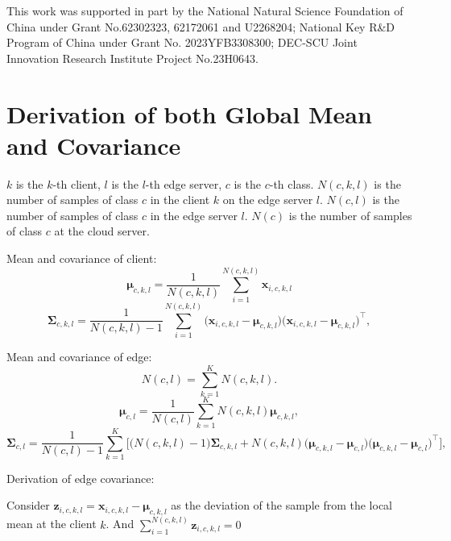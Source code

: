 \documentclass[journal]{IEEEtran}
\begin{document}
This work was supported in part by the National Natural Science Foundation of China under Grant No.62302323, 62172061 and U2268204; National Key R\&D Program of China under Grant No. 2023YFB3308300; DEC-SCU Joint Innovation Research Institute Project No.23H0643.
 



\appendices
\onecolumn

\section{Derivation of both Global Mean and Covariance}
\(k\) is the \(k\)-th client, \(l\) is the \(l\)-th edge server, \(c\) is the \(c\)-th class. \( N(c,k,l) \) is the number of samples of class \( c \) in the client \( k \) on the edge server \( l \). \( N(c,l) \) is the number of samples of class \( c \) in the edge server \( l \). \( N(c) \) is the number of samples of class \( c \) at the cloud server.

Mean and covariance of client:
\begin{equation}
\mathbf{\mu}_{c,k,l} = \frac{1}{N(c,k,l)} \sum_{i=1}^{N(c,k,l)} \mathbf{x}_{i,c,k,l}
\end{equation}
\begin{equation}
\mathbf{\Sigma}_{c,k,l} = \frac{1}{N(c,k,l)-1} \sum_{i=1}^{N(c,k,l)} \big( \mathbf{x}_{i,c,k,l} - \mathbf{\mu}_{c,k,l} \big) \big( \mathbf{x}_{i,c,k,l} - \mathbf{\mu}_{c,k,l} \big)^\top,
\end{equation}

Mean and covariance of edge:
\begin{equation}
  N(c,l) = \sum_{k=1}^K N(c,k,l).
\end{equation}
\begin{equation}
    \mathbf{\mu}_{c,l} = \frac{1}{N(c,l)} \sum_{k=1}^K N(c,k,l) \mathbf{\mu}_{c,k,l},
    \end{equation}
\begin{equation}
\mathbf{\Sigma}_{c,l} = \frac{1}{N(c,l)-1} \sum_{k=1}^K \Bigg[
\big( N(c,k,l)-1 \big) \mathbf{\Sigma}_{c,k,l} + N(c,k,l) \big( \mathbf{\mu}_{c,k,l} - \mathbf{\mu}_{c,l} \big) \big( \mathbf{\mu}_{c,k,l} - \mathbf{\mu}_{c,l} \big)^\top
\Bigg],
\end{equation}

Derivation of edge covariance:

Consider \( \mathbf{z}_{i,c,k,l} = \mathbf{x}_{i,c,k,l} - \mathbf{\mu}_{c,k,l} \) as the deviation of the sample from the local mean at the client \(k \). And \(\sum_{i=1}^{N(c,k,l)} \mathbf{z}_{i,c,k,l} = 0  \)
\end{document}
